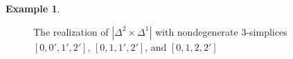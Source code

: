 \documentclass[12pt]{article}
\theoremstyle{plain}
\theoremstyle{definition}
\newtheorem{example}[theorem]{Example}
\begin{document}
\begin{example}
\begin{figure}[!htp]
\begin{center}
\end{center}
\caption{The realization of $|\Delta^2\times \Delta^1|$ with nondegenerate $3$-simplices $[0,0',1',2']$, $[0,1,1',2']$, and $[0,1,2,2']$}\label{F: fig22}
\end{figure}



\end{example}
\end{document}
